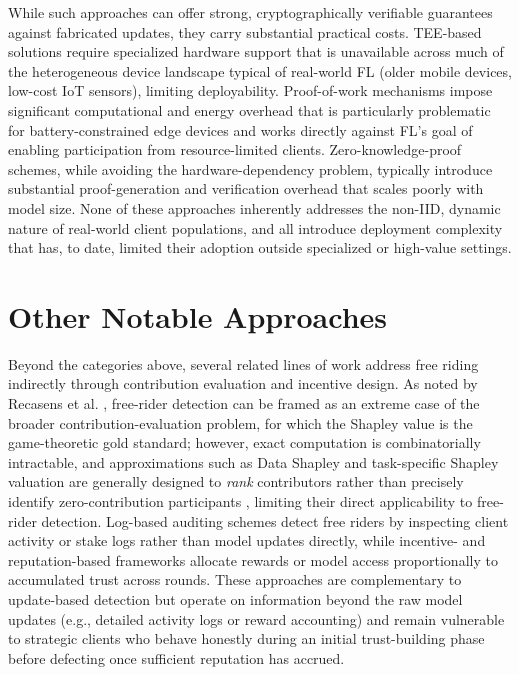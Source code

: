 While such approaches can offer strong, cryptographically verifiable guarantees against fabricated updates, they carry substantial practical costs. TEE-based solutions require specialized hardware support that is unavailable across much of the heterogeneous device landscape typical of real-world FL (older mobile devices, low-cost IoT sensors), limiting deployability. Proof-of-work mechanisms impose significant computational and energy overhead that is particularly problematic for battery-constrained edge devices and works directly against FL's goal of enabling participation from resource-limited clients. Zero-knowledge-proof schemes, while avoiding the hardware-dependency problem, typically introduce substantial proof-generation and verification overhead that scales poorly with model size. None of these approaches inherently addresses the non-IID, dynamic nature of real-world client populations, and all introduce deployment complexity that has, to date, limited their adoption outside specialized or high-value settings.

\section{Other Notable Approaches}
\label{subsec:other-approaches}

Beyond the categories above, several related lines of work address free riding indirectly through contribution evaluation and incentive design. As noted by Recasens et al. \cite{recasens2024frida}, free-rider detection can be framed as an extreme case of the broader contribution-evaluation problem, for which the Shapley value is the game-theoretic gold standard; however, exact computation is combinatorially intractable, and approximations such as Data Shapley and task-specific Shapley valuation are generally designed to \emph{rank} contributors rather than precisely identify zero-contribution participants \cite{ghorbani2019data,jia2019efficient}, limiting their direct applicability to free-rider detection. Log-based auditing schemes detect free riders by inspecting client activity or stake logs rather than model updates directly, while incentive- and reputation-based frameworks allocate rewards or model access proportionally to accumulated trust across rounds. These approaches are complementary to update-based detection but operate on information beyond the raw model updates (e.g., detailed activity logs or reward accounting) and remain vulnerable to strategic clients who behave honestly during an initial trust-building phase before defecting once sufficient reputation has accrued.

